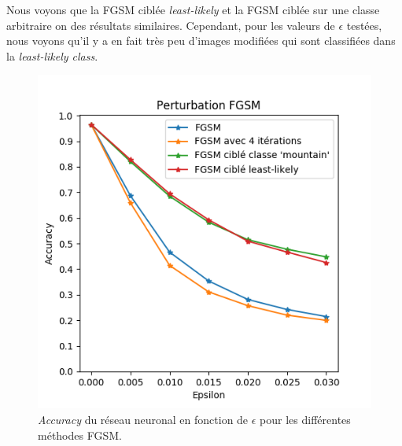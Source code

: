 \documentclass[10pt,twocolumn,letterpaper]{article}
\begin{document}
Nous voyons que la FGSM ciblée \textit{least-likely} et la FGSM ciblée sur une classe arbitraire on des résultats similaires. Cependant, pour les valeurs de $\epsilon$ testées, nous voyons qu'il y a en fait très peu d'images modifiées qui sont classifiées dans la \textit{least-likely class}.

\begin{figure}[!h]
\begin{center}
\includegraphics[width=0.85\linewidth]{ressources/fgsm_least_plot.png}
\end{center}
   \caption{\textit{Accuracy} du réseau neuronal en fonction de $\epsilon$ pour les différentes méthodes FGSM.}
\label{fig:fgsm_least_plot}
\end{figure}
\end{document}
